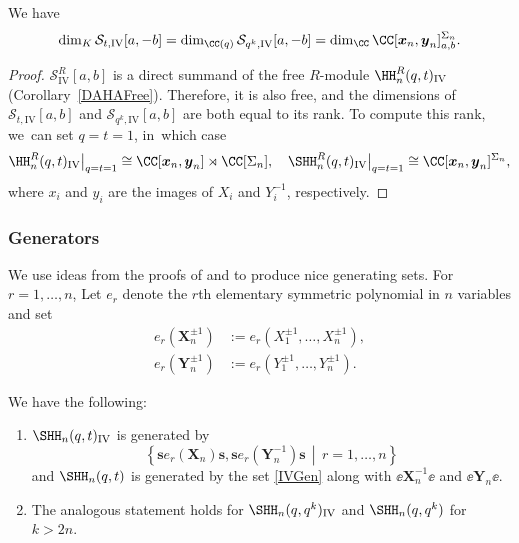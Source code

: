 \begin{prop}\label{IVRank}
We have
\[
\dim_{K}\mathcal{S}_{t,\mathrm{IV}}[a,-b]=\dim_{\CC(q)}\mathcal{S}_{q^k,\mathrm{IV}}[a,-b]=\dim_\CC \CC[\boldsymbol{x}_n,\boldsymbol{y}_n]^{\Sigma_n}_{a,b}.
\]
\end{prop}

\begin{proof}
$\mathcal{S}^R_{\mathrm{IV}}[a,b]$ is a direct summand of the free $R$-module $\HH_n^R(q,t)_{\mathrm{IV}}$ (Corollary~\ref{DAHAFree}).
Therefore, it is also free, and the dimensions of $\mathcal{S}_{t,\mathrm{IV}}[a,b]$ and $\mathcal{S}_{q^k,\mathrm{IV}}[a,b]$ are both equal to its rank.
To compute this rank, we~can set $q=t=1$, in~which case
\[
\HH_n^R(q,t)_{\mathrm{IV}}\big|_{q=t=1}\cong \CC[\boldsymbol{x}_n, \boldsymbol{y}_n]\rtimes\CC[\Sigma_n],\quad
\SHH_n^R(q,t)_{\mathrm{IV}}\big|_{q=t=1}\cong \CC[\boldsymbol{x}_n, \boldsymbol{y}_n]^{\Sigma_n},
\]
where $x_i$ and $y_i$ are the images of $X_i$ and $Y_i^{-1}$, respectively.
\end{proof}

\subsubsection{Generators}\label{Gen}
We use ideas from the proofs of \cite[Prop.\,2.5]{SchiffVassMac} and \cite[Lem.\,5.2]{FFJMM} to produce nice generating sets.
For $r=1,\ldots, n$, Let $e_r$ denote the $r$th elementary symmetric polynomial in $n$ variables and set
\begin{equation}
\begin{aligned}
e_r(\boldsymbol{X}_n^{\pm 1})&:=e_r(X_1^{\pm 1},\ldots, X_n^{\pm 1}),\\
e_r(\boldsymbol{Y}_n^{\pm 1})&:=e_r(Y_1^{\pm 1},\ldots, Y_n^{\pm 1}).
\end{aligned}
\label{ElemXY}
\end{equation}
\begin{lem}\label{GenLem}
We have the following:
\begin{enumerate}
\item\label{GenLem1} $\SHH_n(q,t)_{\mathrm{IV}}$ is generated by
\begin{equation}
\left\{ \boldsymbol{s} e_r(\boldsymbol{X}_n)\boldsymbol{s},\boldsymbol{s} e_r(\boldsymbol{Y}_n^{-1})\boldsymbol{s}\, \middle|\, r=1,\ldots, n \right\}
\label{IVGen}
\end{equation}
and $\SHH_n(q,t)$ is generated by the set \eqref{IVGen} along with $\ee \boldsymbol{X}_n^{-1}\ee$ and $\ee \boldsymbol{Y}_n\ee$.
\item\label{GenLem2} The analogous statement holds for $\SHH_n(q,q^k)_{\mathrm{IV}}$ and $\SHH_n(q,q^k)$ for $k>2n$.
\end{enumerate}
\end{lem}

